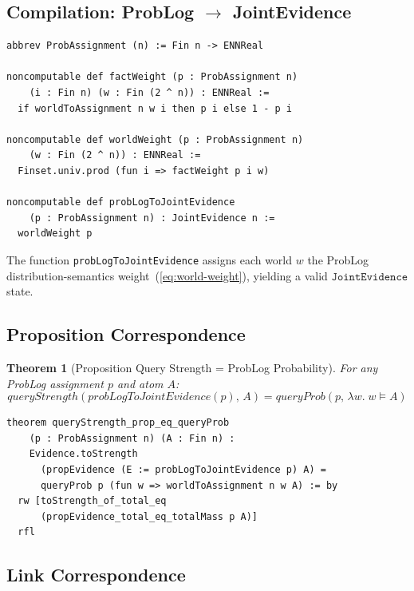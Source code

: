 \documentclass[]{article}
\newtheorem{theorem}{Theorem}
\newcommand{\code}[1]{\texttt{#1}}
\newcommand{\ty}[1]{\ensuremath{\mathtt{#1}}}
\newcommand{\JointEvidence}{\ty{JointEvidence}}
\begin{document}
\subsection{Compilation: ProbLog $\to$ JointEvidence}

\begin{lstlisting}[caption={Core definitions (Lean~4)},label=lst:core-defs]
abbrev ProbAssignment (n) := Fin n -> ENNReal

noncomputable def factWeight (p : ProbAssignment n)
    (i : Fin n) (w : Fin (2 ^ n)) : ENNReal :=
  if worldToAssignment n w i then p i else 1 - p i

noncomputable def worldWeight (p : ProbAssignment n)
    (w : Fin (2 ^ n)) : ENNReal :=
  Finset.univ.prod (fun i => factWeight p i w)

noncomputable def probLogToJointEvidence
    (p : ProbAssignment n) : JointEvidence n :=
  worldWeight p
\end{lstlisting}

\noindent
The function \code{probLogToJointEvidence} assigns each world $w$ the ProbLog
distribution-semantics weight~(\ref{eq:world-weight}), yielding a valid
\JointEvidence{} state.

\subsection{Proposition Correspondence}

\begin{theorem}[Proposition Query Strength = ProbLog Probability]
\label{thm:prop}
For any ProbLog assignment $p$ and atom $A$:
\[
  \mathit{queryStrength}(\mathit{probLogToJointEvidence}(p),\, A)
  = \mathit{queryProb}(p,\, \lambda w.\; w \models A)
\]
\end{theorem}

\begin{lstlisting}[caption={Proposition correspondence (Lean~4)},label=lst:prop-thm]
theorem queryStrength_prop_eq_queryProb
    (p : ProbAssignment n) (A : Fin n) :
    Evidence.toStrength
      (propEvidence (E := probLogToJointEvidence p) A) =
      queryProb p (fun w => worldToAssignment n w A) := by
  rw [toStrength_of_total_eq
      (propEvidence_total_eq_totalMass p A)]
  rfl
\end{lstlisting}

\subsection{Link Correspondence}
\end{document}
